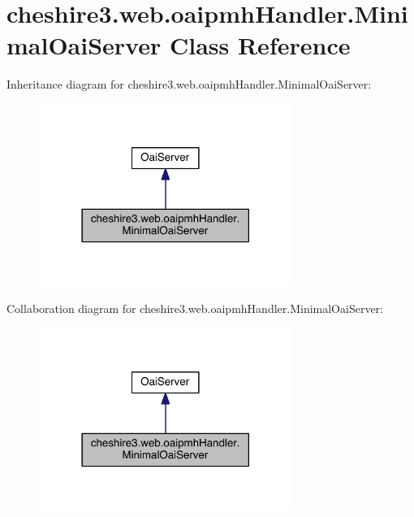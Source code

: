 \hypertarget{classcheshire3_1_1web_1_1oaipmh_handler_1_1_minimal_oai_server}{\section{cheshire3.\-web.\-oaipmh\-Handler.\-Minimal\-Oai\-Server Class Reference}
\label{classcheshire3_1_1web_1_1oaipmh_handler_1_1_minimal_oai_server}
}


Inheritance diagram for cheshire3.\-web.\-oaipmh\-Handler.\-Minimal\-Oai\-Server\-:
\nopagebreak
\begin{figure}[H]
\begin{center}
\leavevmode
\includegraphics[width=234pt]{classcheshire3_1_1web_1_1oaipmh_handler_1_1_minimal_oai_server__inherit__graph}
\end{center}
\end{figure}


Collaboration diagram for cheshire3.\-web.\-oaipmh\-Handler.\-Minimal\-Oai\-Server\-:
\nopagebreak
\begin{figure}[H]
\begin{center}
\leavevmode
\includegraphics[width=234pt]{classcheshire3_1_1web_1_1oaipmh_handler_1_1_minimal_oai_server__coll__graph}
\end{center}
\end{figure}
